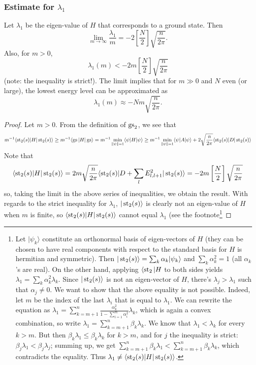 \subsubsection{Estimate for $\lambda_1$}
\begin{proposition}\label{p:lambda_est_pos}
Let $\lambda_1$ be the eigen-value of $H$ that corresponds to a ground state. Then
\[
\lim_{m \rightarrow \infty} \frac{\lambda_1}{m} = -2\left[\frac{N}{2}\right]\sqrt{\frac{n}{2\pi}}.
\]
Also, for $m > 0$,
\[
\lambda_1(m) < -2m\left[\frac{N}{2}\right]\sqrt{\frac{n}{2\pi}}
\]
(note: the inequality is strict!). The limit implies that for $m \gg 0$ and $N$ even (or large), the lowest energy level can be approximated as 
\[
\lambda_1(m) \approx - Nm \sqrt{\frac{n}{2\pi}}.
\]
\end{proposition}
\begin{proof}
Let $m > 0$. From the definition of $\operatorname{gs}_2$, we see that
\[
m^{-1}\langle \operatorname{st}_2(s) | H| \operatorname{st}_2(s) \rangle \geq m^{-1}\langle \operatorname{gs} | H| \operatorname{gs} \rangle = m^{-1}\min_{\|\psi\|=1} \langle \psi |H|\psi\rangle \geq m^{-1}\min_{\|\psi\|=1} \langle \psi |A |\psi\rangle + 2\sqrt{\frac{n}{2\pi}} \langle \operatorname{st}_2(s) | D| \operatorname{st}_2(s)\rangle 
\]
Note that
\[
\langle \operatorname{st}_2(s) | H|\operatorname{st}_2(s) \rangle = 2m\sqrt{\frac{n}{2\pi}} \langle \operatorname{st}_2(s) | D + \sum_l E_{l,l+1}^2 | \operatorname{st}_2(s)\rangle = -2m\left[\frac{N}{2}\right]\sqrt{\frac{n}{2\pi}}
\]
so, taking the limit in the above series of inequalities, we obtain the result.
With regards to the strict inequality for $\lambda_1$, $|\operatorname{st}_2(s)\rangle$ is clearly not an eigen-value of $H$ when $m$ is finite, so $\langle\operatorname{st}_2(s)|H|\operatorname{st}_2(s)\rangle$ cannot equal $\lambda_1$ (see the footnote\footnote{Let $|\psi_k\rangle$ constitute an orthonormal basis of eigen-vectors of $H$ (they can be chosen to have real components with respect to the standard basis for $H$ is hermitian and symmetric). Then $|\operatorname{st}_2(s)\rangle = \sum_{k} \alpha_k |\psi_k\rangle$ and $\sum_{k}\alpha_k^2 = 1$ (all $\alpha_k$'s are real). On the other hand, applying $\langle \operatorname{st}_2 |H$ to both sides yields $\lambda_1 = \sum_{k} \alpha_k^2 \lambda_k$. Since $|\operatorname{st}_2(s)\rangle$ is not an eigen-vector of $H$, there's $\lambda_j > \lambda_1$ such that $\alpha_j \neq 0$. We want to show that the above equality is not possible. Indeed, let $m$ be the index of the last $\lambda_i$ that is equal to $\lambda_1$. We can rewrite the equation as $\lambda_1 = \sum_{k=m+1}^n \frac{\alpha_k^2}{1-\sum_{i=1}^m \alpha_i^2} \lambda_k$, which is again a convex combination, so write $\lambda_1 = \sum_{k=m+1}^n \beta_k\lambda_k$. We know that $\lambda_1 < \lambda_{k}$ for every $k> m$. But then $\beta_k\lambda_1 \leq \beta_k\lambda_k$ for $k > m$, and for $j$ the inequality is strict: $\beta_j\lambda_1 < \beta_j\lambda_j$; summing up, we get $\sum_{k=m+1}^n \beta_k\lambda_1 < \sum_{k=m+1}^n \beta_k \lambda_k$, which contradicts the equality. Thus $\lambda_1 \neq \langle \operatorname{st}_2(s)|H|\operatorname{st}_2(s)\rangle$.

}
\end{proof}
